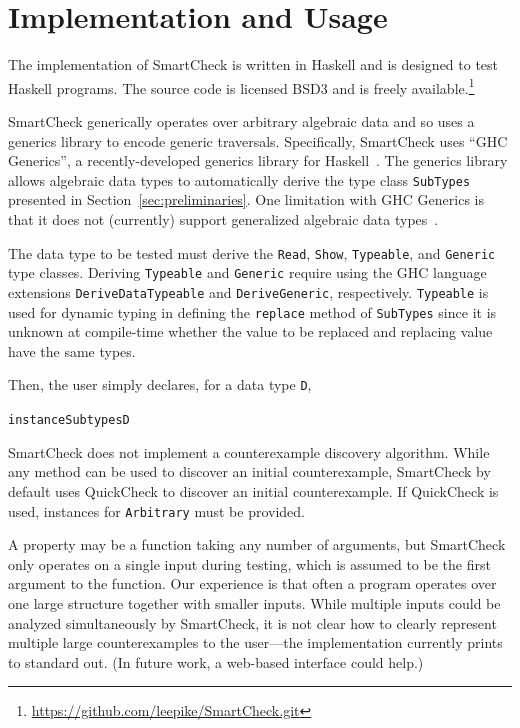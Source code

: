 \documentclass[10pt]{sigplanconf}
\newenvironment{code}{\begin{alltt}\small}{\end{alltt}}
\newcommand{\ttp}[1]{\texttt{#1}}
\begin{document}

\section{Implementation and Usage}\label{sec:implementation}

The implementation of SmartCheck is written in Haskell and is designed to test
Haskell programs.  The source code is licensed BSD3 and is freely
available.\footnote{\url{https://github.com/leepike/SmartCheck.git}}

SmartCheck generically operates over arbitrary algebraic data and so uses a
generics library to encode generic traversals.  Specifically, SmartCheck uses
``GHC Generics'', a recently-developed generics library for
Haskell~\cite{generics}.  The generics library allows algebraic data types to
automatically derive the type class \ttp{SubTypes} presented in
Section~\ref{sec:preliminaries}.  One limitation with GHC Generics is that it
does not (currently) support generalized algebraic data types~\cite{gadts}.

The data type to be tested must derive the \ttp{Read}, \ttp{Show},
\ttp{Typeable}, and \ttp{Generic} type classes.  Deriving \ttp{Typeable} and
\ttp{Generic} require using the GHC language extensions \ttp{DeriveDataTypeable}
and \ttp{DeriveGeneric}, respectively.  \ttp{Typeable} is used for dynamic
typing in defining the \ttp{replace} method of \ttp{SubTypes} since it is
unknown at compile-time whether the value to be replaced and replacing value
have the same types.

Then, the user simply declares, for a data type \ttp{D},
%
\begin{code}
instance Subtypes D
\end{code}
%

SmartCheck does not implement a counterexample discovery algorithm.  While any
method can be used to discover an initial counterexample, SmartCheck by default
uses QuickCheck to discover an initial counterexample.  If QuickCheck is used,
instances for \ttp{Arbitrary} must be provided.

A property may be a function taking any number of arguments, but SmartCheck only
operates on a single input during testing, which is assumed to be the first
argument to the function.  Our experience is that often a program operates over
one large structure together with smaller inputs.  While multiple inputs could
be analyzed simultaneously by SmartCheck, it is not clear how to clearly
represent multiple large counterexamples to the user---the implementation
currently prints to standard out.  (In future work, a web-based interface could help.)
\end{document}
